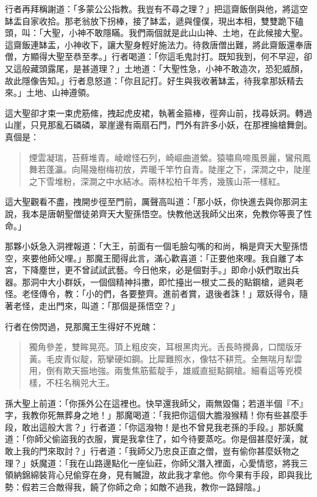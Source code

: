行者再拜稱謝道：「多蒙公公指教。我豈有不尋之理？」把這齋飯倒與他，將這空缽盂自家收拾。那老翁放下拐棒，接了缽盂，遞與僮僕，現出本相，雙雙跪下磕頭，叫：「大聖，小神不敢隱瞞。我們兩個就是此山山神、土地，在此候接大聖。這齋飯連缽盂，小神收下，讓大聖身輕好施法力。待救唐僧出難，將此齋飯還奉唐僧，方顯得大聖至恭至孝。」行者喝道：「你這毛鬼討打。既知我到，何不早迎，卻又這般藏頭露尾，是甚道理？」土地道：「大聖性急，小神不敢造次，恐犯威顏，故此隱像告知。」行者息怒道：「你且記打。好生與我收著缽盂，待我拿那妖精去來。」土地、山神遵領。

這大聖卻才束一束虎筋絛，拽起虎皮裙，執著金箍棒，徑奔山前，找尋妖洞。轉過山崖，只見那亂石磷磷，翠崖邊有兩扇石門，門外有許多小妖，在那裡掄槍舞劍。真個是：
\begin{quote}
煙雲凝瑞，苔蘚堆青。崚嶒怪石列，崎嶇曲道縈。猿嘯鳥啼風景麗，鸞飛鳳舞若蓬瀛。向陽幾樹梅初放，弄暖千竿竹自青。陡崖之下，深澗之中，陡崖之下雪堆粉，深澗之中水結冰。兩林松柏千年秀，幾簇山茶一樣紅。
\end{quote}

這大聖觀看不盡，拽開步徑至門前，厲聲高叫道：「那小妖，你快進去與你那洞主說，我本是唐朝聖僧徒弟齊天大聖孫悟空。快教他送我師父出來，免教你等喪了性命。」

那夥小妖急入洞裡報道：「大王，前面有一個毛臉勾嘴的和尚，稱是齊天大聖孫悟空，來要他師父哩。」那魔王聞得此言，滿心歡喜道：「正要他來哩。我自離了本宮，下降塵世，更不曾試試武藝。今日他來，必是個對手。」即命小妖們取出兵器。那洞中大小群妖，一個個精神抖擻，即忙擡出一根丈二長的點鋼槍，遞與老怪。老怪傳令，教：「小的們，各要整齊。進前者賞，退後者誅！」眾妖得令，隨著老怪，走出門來，叫道：「那個是孫悟空？」

行者在傍閃過，見那魔王生得好不兇醜：
\begin{quote}
獨角參差，雙眸晃亮。頂上粗皮突，耳根黑肉光。舌長時攪鼻，口闊版牙黃。毛皮青似靛，筋攣硬如鋼。比犀難照水，像牯不耕荒。全無喘月犁雲用，倒有欺天振地強。兩隻焦筋藍靛手，雄威直挺點鋼槍。細看這等兇模樣，不枉名稱兕大王。
\end{quote}

孫大聖上前道：「你孫外公在這裡也。快早還我師父，兩無毀傷；若道半個『不』字，我教你死無葬身之地！」那魔喝道：「我把你這個大膽潑猴精！你有些甚麼手段，敢出這般大言？」行者道：「你這潑物！是也不曾見我老孫的手段。」那妖魔道：「你師父偷盜我的衣服，實是我拿住了，如今待要蒸吃。你是個甚麼好漢，就敢上我的門來取討？」行者道：「我師父乃忠良正直之僧，豈有偷你甚麼妖物之理？」妖魔道：「我在山路邊點化一座仙莊，你師父潛入裡面，心愛情慾，將我三領納錦綿裝背心兒偷穿在身，見有贓證，故此我才拿他。你今果有手段，即與我比勢：假若三合敵得我，饒了你師之命；如敵不過我，教你一路歸陰。」

